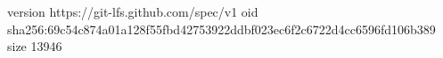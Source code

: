 version https://git-lfs.github.com/spec/v1
oid sha256:69c54c874a01a128f55fbd42753922ddbf023ec6f2c6722d4cc6596fd106b389
size 13946
